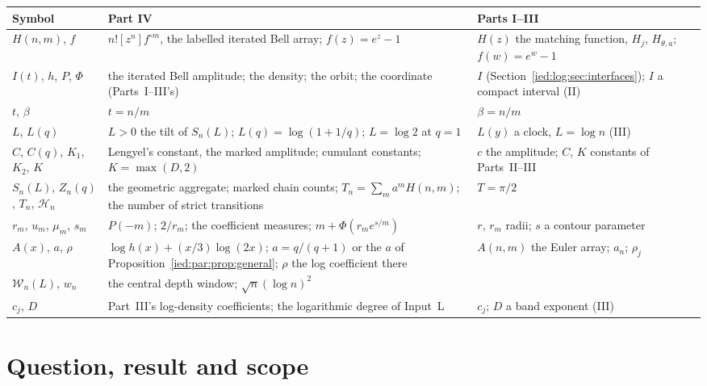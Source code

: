 \documentclass[11pt,letterpaper]{article}
\theoremstyle{remark}\newtheorem{remark}[theorem]{Remark}
\begin{document}
\begingroup\small
\renewcommand{\arraystretch}{1.1}
\renewcommand{\theHtable}{iedpar.notation}%
\begin{longtable}{@{}>{\raggedright\arraybackslash}p{0.95in}>{\raggedright\arraybackslash}p{3.0in}>{\raggedright\arraybackslash}p{2.2in}@{}}
\toprule
Symbol & Part IV & Parts I--III\\
\midrule
\endhead
$H(n,m)$, $f$ & $n![z^n]f^{\circ m}$, the labelled iterated Bell array; $f(z)=e^z-1$ & $H(z)$ the matching function, $H_j$, $H_{\theta,a}$; $f(w)=e^w-1$\\
$I(t)$, $h$, $P$, $\Phi$ & the iterated Bell amplitude; the density; the orbit; the coordinate (Parts~I--III's) & $I$ (Section~\ref{ied:log:sec:interfaces}); $I$ a compact interval (II)\\
$t$, $\beta$ & $t=n/m$ & $\beta=n/m$\\
$L$, $L(q)$ & $L>0$ the tilt of $S_n(L)$; $L(q)=\log(1+1/q)$; $L=\log2$ at $q=1$ & $L(y)$ a clock, $L=\log n$ (III)\\
$C$, $C(q)$, $K_1$, $K_2$, $K$ & Lengyel's constant, the marked amplitude; cumulant constants; $K=\max(D,2)$ & $c$ the amplitude; $C$, $K$ constants of Parts~II--III\\
$S_n(L)$, $Z_n(q)$, $T_n$, $\mathcal H_n$ & the geometric aggregate; marked chain counts; $T_n=\sum_ma^mH(n,m)$; the number of strict transitions & $T=\pi/2$\\
$r_m$, $u_m$, $\mu_m$, $s_m$ & $P(-m)$; $2/r_m$; the coefficient measures; $m+\Phi(r_me^{s/m})$ & $r$, $r_m$ radii; $s$ a contour parameter\\
$A(x)$, $a$, $\rho$ & $\log h(x)+(x/3)\log(2x)$; $a=q/(q+1)$ or the $a$ of Proposition~\ref{ied:par:prop:general}; $\rho$ the log coefficient there & $A(n,m)$ the Euler array; $a_n$; $\rho_j$\\
$\mathcal W_n(L)$, $w_n$ & the central depth window; $\sqrt n(\log n)^2$ & \\
$c_j$, $D$ & Part~III's log-density coefficients; the logarithmic degree of Input~L & $c_j$; $D$ a band exponent (III)\\
\bottomrule
\end{longtable}
\addtocounter{table}{-1}%
\endgroup

\section{Question, result and scope}\label{ied:par:sec:intro}
\end{document}
